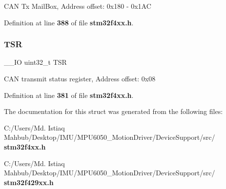 C\+AN Tx Mail\+Box, Address offset\+: 0x180 -\/ 0x1\+AC 

Definition at line \textbf{ 388} of file \textbf{ stm32f4xx.\+h}.

\mbox{\label{structCAN__TypeDef_a87e3001757a0cd493785f1f3337dd0e8}} 
\subsubsection{T\+SR}
{\footnotesize\ttfamily \+\_\+\+\_\+\+IO uint32\+\_\+t T\+SR}

C\+AN transmit status register, Address offset\+: 0x08 

Definition at line \textbf{ 381} of file \textbf{ stm32f4xx.\+h}.



The documentation for this struct was generated from the following files\+:\begin{DoxyCompactItemize}
\item 
C\+:/\+Users/\+Md. Istiaq Mahbub/\+Desktop/\+I\+M\+U/\+M\+P\+U6050\+\_\+\+Motion\+Driver/\+Device\+Support/src/\textbf{ stm32f4xx.\+h}\item 
C\+:/\+Users/\+Md. Istiaq Mahbub/\+Desktop/\+I\+M\+U/\+M\+P\+U6050\+\_\+\+Motion\+Driver/\+Device\+Support/src/\textbf{ stm32f429xx.\+h}\end{DoxyCompactItemize}
